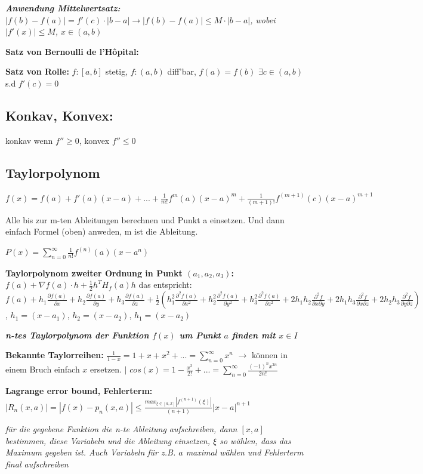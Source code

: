 \documentclass[a3paper, ngerman, 8pt]{article}
\begin{document}
\begin{multicols*}{3}
\textit{\textbf{Anwendung Mittelwertsatz:} $|f(b)-f(a)|=f'(c)\cdot |b-a| \to |f(b)-f(a)|\leq M \cdot |b-a|$, wobei $|f'(x)|\leq M $, $x \in (a,b)$}

\textbf{Satz von Bernoulli de l'Hôpital:}

\textbf{Satz von Rolle:} $f: [a,b]$ stetig, $f:(a,b)$ diff'bar, $f(a)=f(b)$ $\exists c \in (a,b)$ s.d $f'(c)=0$

\subsection*{Konkav, Konvex:} konkav wenn $f''\geq0$, konvex $f''\leq 0$

\subsection*{Taylorpolynom}
$f(x)=f(a)+f'(a)(x-a)+...+\frac{1}{m!}f^{m}(a)(x-a)^m+\frac{1}{(m+1)!}f^{(m+1)}(c)(x-a)^{m+1}$

Alle bis zur m-ten Ableitungen berechnen und Punkt a einsetzen. Und dann einfach Formel (oben) anweden, m ist die Ableitung. 

$P(x)=\sum_{n=0}^{\infty}\frac{1}{n!}f^{(n)}(a)(x-a^n)$

\textbf{Taylorpolynom zweiter Ordnung in Punkt $(a_1, a_2, a_3)$:} $f(a) + \nabla f(a)\cdot h + \frac{1}{2}h^TH_f(a)h$ das entspricht: $f(a) + h_1 \frac{\partial f(a)}{\partial x}+h_2\frac{\partial f(a)}{\partial y}+h_3\frac{\partial f(a)}{\partial z}+\frac{1}{2}(h_1^2\frac{\partial^2 f(a)}{\partial x^2}+h_2^2\frac{\partial^2 f(a)}{\partial y^2}+h_3^2\frac{\partial^2 f(a)}{\partial z^2}+2h_1h_2\frac{\partial ^2 f}{\partial x \partial y}+2h_1h_3\frac{\partial ^2 f}{\partial x \partial z}+2h_2h_3\frac{\partial ^2 f}{\partial y \partial z})$, $h_1=(x-a_1)$, $h_2=(x-a_2)$, $h_1=(x-a_2)$

\textit{\textbf{n-tes Taylorpolynom der Funktion $f(x)$ um Punkt $a$ finden mit $x \in I$}}

\textbf{Bekannte Taylorreihen:} $\frac{1}{1-x}=1+x+x^2+...=\sum_{n=0}^{\infty}x^n$ $\to$ können in einem Bruch einfach $x$ ersetzen. $\big \vert$ $cos(x)=1-\frac{x^2}{2!}+...=\sum_{n=0}^{\infty}\frac{(-1)^n x^{2n}}{2n!}$

\textbf{Lagrange error bound, Fehlerterm:} $|R_n(x,a)| = |f(x)-p_n(x,a)|\leq \frac{max_{\xi \in [a,x]}|f^{{(n+1)}}(\xi)|}{(n+1)\!}|x-a|^{n+1}$

\textit{für die gegebene Funktion die n-te Ableitung aufschreiben, dann $[x, a]$ bestimmen, diese Variabeln und die Ableitung einsetzen, $\xi$ so wählen, dass das Maximum gegeben ist. Auch Variabeln für z.B. $a$ maximal wählen und Fehlerterm final aufschreiben}


\end{multicols*}
\end{document}
